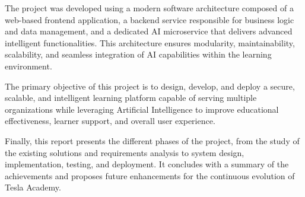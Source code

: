 The project was developed using a modern software architecture composed of a web-based
frontend application, a backend service responsible for business logic and data management,
and a dedicated AI microservice that delivers advanced intelligent functionalities. This
architecture ensures modularity, maintainability, scalability, and seamless integration of
AI capabilities within the learning environment.

The primary objective of this project is to design, develop, and deploy a secure, scalable,
and intelligent learning platform capable of serving multiple organizations while leveraging
Artificial Intelligence to improve educational effectiveness, learner support, and overall
user experience.

Finally, this report presents the different phases of the project, from the study of the
existing solutions and requirements analysis to system design, implementation, testing, and
deployment. It concludes with a summary of the achievements and proposes future enhancements
for the continuous evolution of Tesla Academy.
 
